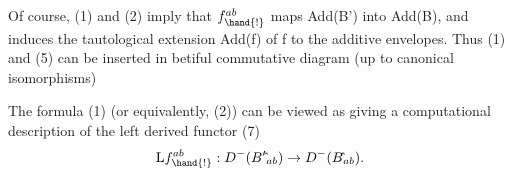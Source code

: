 Of course, (1) and (2) imply that  $f_{\hand{!}}^{ab}$ maps  Add(B')
into Add(B), and induces the tautological extension Add(f)  of
f to the additive envelopes. Thus (1) and (5) can be inserted in 
betiful commutative diagram (up to canonical isomorphisms)
 

The formula (1) (or equivalently, (2)) can be viewed as giving a
computational description of the left derived functor 
(7) \[ \mathrm{L}f_{\hand{!}}^{ab} : D^-(B'\hat{}_{ab}) \to D^-(B\hat{}_{ab}). \]

